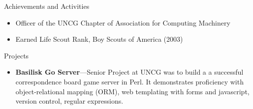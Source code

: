 \documentclass[12pt,oneside]{article}
\newenvironment{ressection}[1]{
	\vspace{4pt}
	{\fontfamily{phv}\selectfont\Large#1}
	\begin{itemize}
	\vspace{3pt}
}{
	\end{itemize}
}
\newcommand{\resitem}[1]{
	\vspace{-4pt}
	\item \begin{flushleft} #1 \end{flushleft}
}
\newcommand{\ressubitem}[1]{
	\vspace{-1pt}
	\item \begin{flushleft} #1 \end{flushleft}
}
\newcommand{\resbigitem}[3]{
	\vspace{-5pt}
	\item
	\textbf{#1}---#2 \\
	\textit{#3}
}
\newenvironment{ressubsec}[3]{
	\resbigitem{#1}{#2}{#3}
	\vspace{-2pt}
	\begin{itemize}
}{
	\end{itemize}
}
\begin{document}
\begin{ressection}{Achievements and Activities}

	\resitem{Officer of the UNCG Chapter of Association for Computing Machinery}

	\resitem{Earned Life Scout Rank, Boy Scouts of America (2003)}


\end{ressection}


\begin{ressection}{Projects}

	\begin{ressubsec}{Basilisk Go Server}{Senior Project at UNCG was to build a a successful correspondence
         board game server in Perl. It demonstrates proficiency with object-relational mapping (ORM),
         web templating with forms and javascript, version control, regular expressions.}{}
	\end{ressubsec}

\end{ressection}
\end{document}
